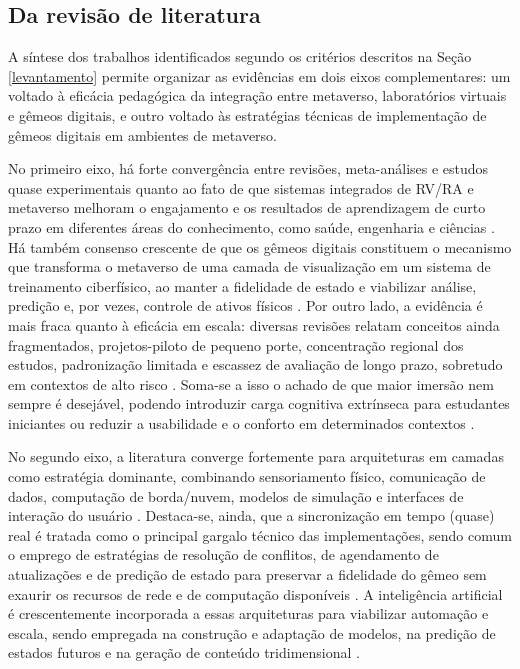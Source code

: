 \documentclass[12pt]{article}
\begin{document}
\subsection{Da revisão de literatura}
\label{res:revisao}

A síntese dos trabalhos identificados segundo os critérios descritos na Seção \ref{levantamento} permite organizar as evidências em dois eixos complementares: um voltado à eficácia pedagógica da integração entre metaverso, laboratórios virtuais e gêmeos digitais, e outro voltado às estratégias técnicas de implementação de gêmeos digitais em ambientes de metaverso.

No primeiro eixo, há forte convergência entre revisões, meta-análises e estudos quase experimentais quanto ao fato de que sistemas integrados de RV/RA e metaverso melhoram o engajamento e os resultados de aprendizagem de curto prazo em diferentes áreas do conhecimento, como saúde, engenharia e ciências \cite{Li2024Effectiveness, Lampropoulos2024Virtual, Ibili2024Assessing}. Há também consenso crescente de que os gêmeos digitais constituem o mecanismo que transforma o metaverso de uma camada de visualização em um sistema de treinamento ciberfísico, ao manter a fidelidade de estado e viabilizar análise, predição e, por vezes, controle de ativos físicos \cite{Mitra2023Metaverse, Yang2025Live, Tu2024Architecture, Han2023A}. Por outro lado, a evidência é mais fraca quanto à eficácia em escala: diversas revisões relatam conceitos ainda fragmentados, projetos-piloto de pequeno porte, concentração regional dos estudos, padronização limitada e escassez de avaliação de longo prazo, sobretudo em contextos de alto risco \cite{Onu2023Potential, Sripan2025MetaverseBased, Jiang2025Virtual, Chen2026Metaverse}. Soma-se a isso o achado de que maior imersão nem sempre é desejável, podendo introduzir carga cognitiva extrínseca para estudantes iniciantes ou reduzir a usabilidade e o conforto em determinados contextos \cite{Poupard2024A}.

No segundo eixo, a literatura converge fortemente para arquiteturas em camadas como estratégia dominante, combinando sensoriamento físico, comunicação de dados, computação de borda/nuvem, modelos de simulação e interfaces de interação do usuário \cite{Schroeder2021Methodology, Albalkhy2024Digital, Yu2022BiDirectional}. Destaca-se, ainda, que a sincronização em tempo (quase) real é tratada como o principal gargalo técnico das implementações, sendo comum o emprego de estratégias de resolução de conflitos, de agendamento de atualizações e de predição de estado para preservar a fidelidade do gêmeo sem exaurir os recursos de rede e de computação disponíveis \cite{Liang2024Multiple, VanHuynh2022Edge}. A inteligência artificial é crescentemente incorporada a essas arquiteturas para viabilizar automação e escala, sendo empregada na construção e adaptação de modelos, na predição de estados futuros e na geração de conteúdo tridimensional \cite{Sajadieh2025From, Jamshidi2024An, Ahmed2025A}.
\end{document}
